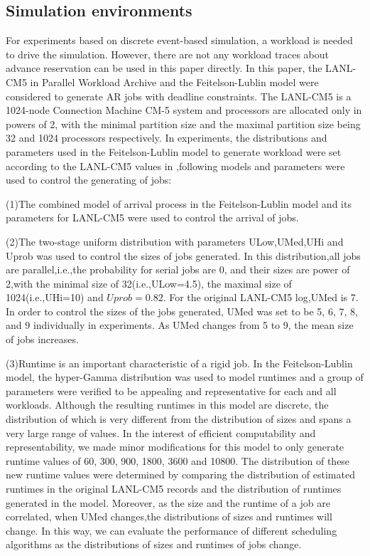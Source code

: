 \documentclass[preprint,12pt]{elsarticle}
\begin{document}
\subsection{Simulation environments}

For experiments based on discrete event-based simulation, a workload is needed to
drive the simulation. However, there are not any workload traces about advance reservation can be
used in this paper directly. In this paper, the LANL-CM5 in Parallel Workload Archive\cite{pwa} and the Feitelson-Lublin model\cite{lublin2003workload} were considered to generate AR jobs with deadline constraints. The LANL-CM5 is a 1024-node Connection Machine CM-5 system and processors are allocated only in powers of 2, with the minimal partition size and the maximal partition size being 32 and 1024 processors respectively. In experiments, the distributions and parameters used in the Feitelson-Lublin model to generate workload were set according to the LANL-CM5 values in \cite{lublin2003workload},following models and parameters were used to control the generating of jobs:

(1)The combined model of arrival process in the Feitelson-Lublin model and its parameters for LANL-CM5 were used to control the arrival of jobs.

(2)The two-stage uniform distribution with parameters ULow,UMed,UHi and Uprob was used to control the sizes of jobs generated. In this distribution,all jobs are parallel,i.e.,the probability for serial jobs are 0, and their sizes are power of 2,with the minimal size of 32(i.e.,ULow=4.5), the maximal size of 1024(i.e.,UHi=10) and $Uprob=0.82$. For the original LANL-CM5 log,UMed is 7. In order to control the sizes of the jobs generated, UMed was set to be 5, 6, 7, 8, and 9 individually in experiments. As UMed changes from 5 to 9, the mean size of jobs increases.

(3)Runtime is an important characteristic of a rigid job. In the Feitelson-Lublin model, the hyper-Gamma distribution was used to model runtimes and a group of parameters were verified to be appealing and representative for each and all workloads. Although the resulting runtimes in this model are discrete, the distribution of which is very different from the distribution of sizes and spans a very large range of values. In the interest of efficient computability and representability,  we made minor modifications for this model to only generate runtime values of 60, 300, 900, 1800, 3600 and 10800. The distribution of these new runtime values were determined by comparing the distribution of estimated runtimes in the original LANL-CM5 records and the distribution of runtimes generated in the model. Moreover, as the size and the runtime of a job are correlated, when UMed changes,the distributions of sizes and runtimes will change. In this way, we can evaluate the performance of different scheduling algorithms as the distributions of sizes and runtimes of jobs change.
\end{document}
